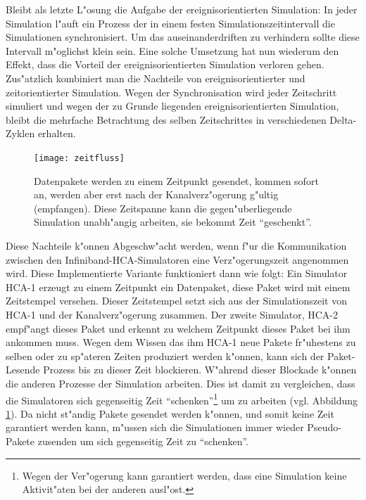 Bleibt als letzte L"osung die Aufgabe der ereignisorientierten 
Simulation: In jeder Simulation l"auft ein Prozess der in einem festen 
Simulationszeitintervall die Simulationen synchronisiert. Um das auseinanderdriften
zu verhindern sollte diese Intervall m"oglichst klein sein. Eine solche Umsetzung 
hat nun wiederum den Effekt, dass die Vorteil der ereignisorientierten  
Simulation verloren gehen. Zus"atzlich kombiniert man die Nachteile von 
ereignisorientierter und zeitorientierter Simulation. Wegen der Synchronisation 
wird jeder Zeitschritt simuliert und wegen der zu Grunde liegenden ereignisorientierten
Simulation, bleibt die mehrfache Betrachtung des selben Zeitschrittes in verschiedenen
Delta-Zyklen erhalten.
\begin{figure}
\begin{center}
\texttt{[image: zeitfluss]}
\caption{Datenpakete werden zu einem Zeitpunkt gesendet, kommen sofort an, werden aber erst
nach der Kanalverz"ogerung g"ultig (empfangen). Diese Zeitspanne kann die gegen"uberliegende
Simulation unabh"angig arbeiten, sie bekommt Zeit ``geschenkt''.}
\label{fig:zeitfluss}
\end{center}
\end{figure}


Diese Nachteile k"onnen Abgeschw"acht werden, wenn f"ur die Kommunikation zwischen
den Infiniband-HCA-Simulatoren eine Verz"ogerungszeit angenommen wird. Diese Implementierte
Variante funktioniert dann wie folgt: Ein Simulator HCA-1 erzeugt zu einem Zeitpunkt 
ein Datenpaket, diese Paket wird mit einem Zeitstempel versehen. Dieser Zeitstempel
setzt sich aus der Simulationszeit von HCA-1 und der Kanalverz"ogerung zusammen. Der
zweite Simulator, HCA-2 empf"angt dieses Paket und erkennt zu welchem Zeitpunkt dieses
Paket bei ihm ankommen muss. Wegen dem Wissen das ihm HCA-1 neue Pakete fr"uhestens zu selben
oder zu sp"ateren Zeiten produziert werden k"onnen, kann sich der Paket-Lesende Prozess
bis zu dieser Zeit blockieren. W"ahrend dieser Blockade k"onnen die anderen Prozesse der 
Simulation arbeiten. Dies ist damit zu vergleichen, dass die Simulatoren sich gegenseitig 
Zeit ``schenken''\footnote{Wegen der Ver"ogerung kann garantiert werden, dass eine Simulation
keine Aktivit"aten bei der anderen ausl"ost.} um zu arbeiten (vgl. 
Abbildung \ref{fig:zeitfluss}). Da nicht st"andig Pakete 
gesendet werden k"onnen, und somit keine Zeit garantiert werden kann, m"ussen sich die 
Simulationen immer wieder Pseudo-Pakete zusenden um sich gegenseitig Zeit zu 
``schenken''. 

